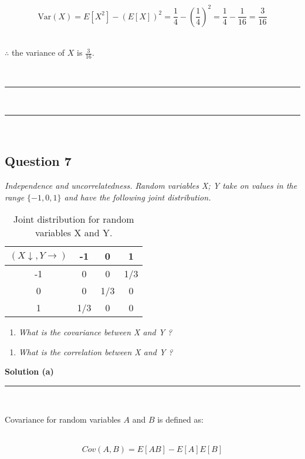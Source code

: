\documentclass{article}
\begin{document}
$$\text{Var}(X) = E[X^2] - (E[X])^2 = \frac{1}{4} - (\frac{1}{4})^2 = \frac{1}{4} - \frac{1}{16} = \frac{3}{16}$$\\

\parbox{\textwidth}{$\therefore$ the variance of $X$ is $\frac{3}{16}$.}\\

\noindent\rule{\textwidth}{0.4pt}\\
\noindent\rule{\textwidth}{0.4pt}\\

\newpage

\subsection*{Question 7}
\textit{Independence and uncorrelatedness. Random variables X; Y take on values in the range $\{-1,0,1\}$ and have the following joint distribution.}\\

\begin{table}[h]
\centering
\begin{tabular}{c|ccc}
  $(X\downarrow ,Y \rightarrow)$ & -1 & 0 & 1 \\ \hline
-1 & 0 & 0 & 1/3 \\
 0 & 0 & 1/3 & 0 \\
 1 & 1/3 & 0 & 0 \\
\end{tabular}
\caption{Joint distribution for random variables X and Y.}
\label{tab:example_fractions}
\end{table}

\begin{enumerate}[label=(a)]
  \item \textit{What is the covariance between X and Y ?}
\end{enumerate}

\begin{enumerate}[label=(b)]
  \item \textit{What is the correlation between X and Y ?}
\end{enumerate}

\textbf{Solution (a)}

\noindent\rule{\textwidth}{0.4pt}\\

\parbox{\textwidth}{Covariance for random variables $A$ and $B$ is defined as:}\\

$$Cov(A, B) = E[AB] - E[A]E[B]$$
\end{document}
